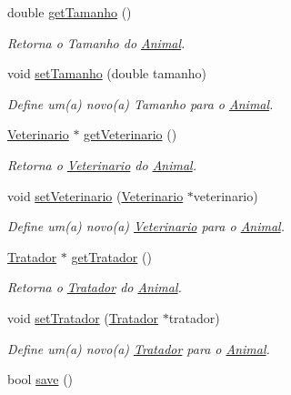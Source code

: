 \begin{DoxyCompactItemize}
double \hyperlink{classAnimal_a3936ff4ad07fee3173db2a9dff52c706}{get\+Tamanho} ()
\begin{DoxyCompactList}\small\item\em Retorna o Tamanho do \hyperlink{classAnimal}{Animal}. \end{DoxyCompactList}\item 
void \hyperlink{classAnimal_a53daf7711c6b6430c723647b2cec7c36}{set\+Tamanho} (double tamanho)
\begin{DoxyCompactList}\small\item\em Define um(a) novo(a) Tamanho para o \hyperlink{classAnimal}{Animal}. \end{DoxyCompactList}\item 
\hyperlink{classVeterinario}{Veterinario} $\ast$ \hyperlink{classAnimal_a2c8aacd4e6709ae559c4b17d6856a3df}{get\+Veterinario} ()
\begin{DoxyCompactList}\small\item\em Retorna o \hyperlink{classVeterinario}{Veterinario} do \hyperlink{classAnimal}{Animal}. \end{DoxyCompactList}\item 
void \hyperlink{classAnimal_ace9b58ea47057261292ce42a4edd2870}{set\+Veterinario} (\hyperlink{classVeterinario}{Veterinario} $\ast$veterinario)
\begin{DoxyCompactList}\small\item\em Define um(a) novo(a) \hyperlink{classVeterinario}{Veterinario} para o \hyperlink{classAnimal}{Animal}. \end{DoxyCompactList}\item 
\hyperlink{classTratador}{Tratador} $\ast$ \hyperlink{classAnimal_a386807706a0ba203fe84b68cd10c38aa}{get\+Tratador} ()
\begin{DoxyCompactList}\small\item\em Retorna o \hyperlink{classTratador}{Tratador} do \hyperlink{classAnimal}{Animal}. \end{DoxyCompactList}\item 
void \hyperlink{classAnimal_aec8cd2eec7a0c833074e303f389c8f9f}{set\+Tratador} (\hyperlink{classTratador}{Tratador} $\ast$tratador)
\begin{DoxyCompactList}\small\item\em Define um(a) novo(a) \hyperlink{classTratador}{Tratador} para o \hyperlink{classAnimal}{Animal}. \end{DoxyCompactList}\item 
bool \hyperlink{classAnimal_a0733e9c19d226749195ebe9e64df8964}{save} ()

\end{DoxyCompactItemize}
